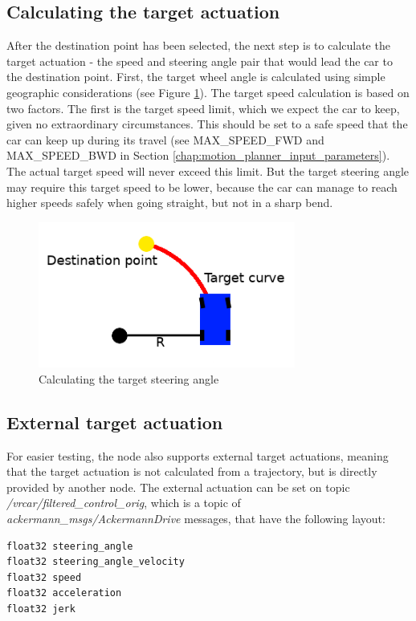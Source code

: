 \subsection{Calculating the target actuation}
After the destination point has been selected, the next step is to calculate the target actuation - the speed and steering angle pair that would lead the car to the destination point. First, the target wheel angle is calculated using simple geographic considerations (see Figure \ref{calc_steering_angle}). The target speed calculation is based on two factors. The first is the target speed limit, which we expect the car to keep, given no extraordinary circumstances. This should be set to a safe speed that the car can keep up during its travel (see MAX\_SPEED\_FWD and MAX\_SPEED\_BWD in Section \ref{chap:motion_planner_input_parameters}). The actual target speed will never exceed this limit. But the target steering angle may require this target speed to be lower, because the car can manage to reach higher speeds safely when going straight, but not in a sharp bend.

\begin{figure}[!ht]
    \centering
    \includegraphics[height=48mm]{figures/raw/calc_steering_angle.png}
    \caption{Calculating the target steering angle}
    \label{calc_steering_angle}
\end{figure}

\subsection{External target actuation}
For easier testing, the node also supports external target actuations, meaning that the target actuation is not calculated from a trajectory, but is directly provided by another node. The external actuation can be set on topic \textit{/vrcar/filtered\_control\_orig}, which is a topic of \textit{ackermann\_msgs/AckermannDrive} \cite{ros_msg_AckermannDrive} messages, that have the following layout:

\begin{minipage}{\textwidth}
\begin{lstlisting}[language=IDL]
float32 steering_angle
float32 steering_angle_velocity
float32 speed
float32 acceleration
float32 jerk
\end{lstlisting}
\end{minipage}

